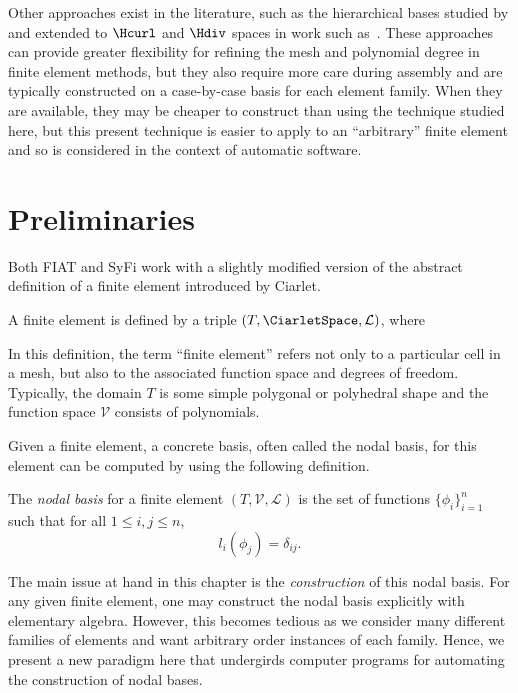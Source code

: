 Other approaches exist in the literature, such as the hierarchical
bases studied by \citet{SzaboBabuska1991}
and extended to $\Hcurl$ and $\Hdiv$ spaces in work such
as~\citet{AinsworthCoyle2003}.  These approaches can provide greater
flexibility for refining the mesh and polynomial degree in finite
element methods, but they also require more care during assembly and are
typically constructed on a case-by-case basis for each element family.
When they are available, they may be cheaper to construct than using the
technique studied here, but this present technique is easier to apply
to an ``arbitrary'' finite element and so is considered in the context
of automatic software.

\section{Preliminaries}

Both FIAT and SyFi work with a slightly modified version of the abstract
definition of a finite element introduced by Ciarlet.
\begin{definition}
  A finite element is defined by a triple
  $(T, \CiarletSpace,\mathcal{L})$, where
  \femdefinition{}
  \label{chap:kirby-1:fedef}
\end{definition}
In this definition, the term ``finite element'' refers not only to a
particular cell in a mesh, but also to the associated function space
and degrees of freedom.  Typically, the domain $T$ is some simple
polygonal or polyhedral shape and the function space $\mathcal{V}$
consists of polynomials.

Given a finite element, a concrete basis, often called the nodal basis,
for this element can be computed by using the following definition.
%
\begin{definition}
The \emph{nodal basis} for a finite element $(T,\mathcal{V},\mathcal{L})$
is the set of functions $\{ \phi_i \}_{i=1}^{n}$ such
that for all $1 \leqslant i,j \leqslant n$,
\begin{equation}
l_i(\phi_j) = \delta_{ij}.
\end{equation}
\label{chap:kirby-1:nodaldef}
\end{definition}

The main issue at hand in this chapter is the \emph{construction} of this
nodal basis.  For any given finite element, one may construct the nodal
basis explicitly with elementary algebra.  However, this becomes tedious
as we consider many different families of elements and want arbitrary
order instances of each family.  Hence, we present a new paradigm here
that undergirds computer programs for automating the construction of
nodal bases.

